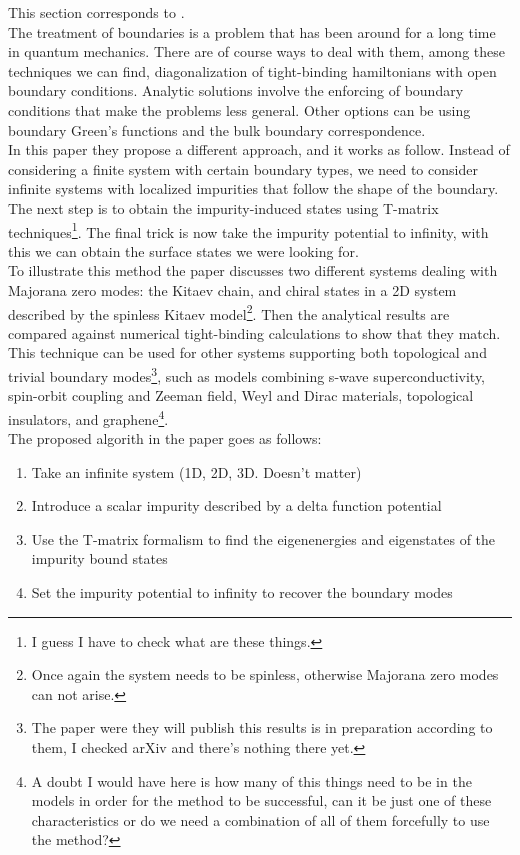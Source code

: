 This section corresponds to \cite{2018Bena}.\\

The treatment of boundaries is a problem that has been around for a long time in quantum mechanics. There are of course ways to deal with them, among these techniques we can find, diagonalization of tight-binding hamiltonians with open boundary conditions. Analytic solutions involve the enforcing of boundary conditions that make the problems less general. Other options can be using boundary Green's functions and the bulk boundary correspondence.\\

In this paper they propose a different approach, and it works as follow. Instead of considering a finite system with certain boundary types, we need to consider infinite systems with localized impurities that follow the shape of the boundary. The next step is to obtain the impurity-induced states using T-matrix techniques\footnote{I guess I have to check what are these things.}. The final trick is now take the impurity potential to infinity, with this we can obtain the surface states we were looking for.\\

To illustrate this method the paper discusses two different systems dealing with Majorana zero modes: the Kitaev chain, and chiral states in a 2D system described by the spinless Kitaev model\footnote{Once again the system needs to be spinless, otherwise Majorana zero modes can not arise.}. Then the analytical results are compared against numerical tight-binding calculations to show that they match. This technique can be used for other systems supporting both topological and trivial boundary modes\footnote{The paper were they will publish this results is in preparation according to them, I checked arXiv and there's nothing there yet.}, such as models combining s-wave superconductivity, spin-orbit coupling and Zeeman field, Weyl and Dirac materials, topological insulators, and graphene\footnote{A doubt I would have here is how many of this things need to be in the models in order for the method to be successful, can it be just one of these characteristics or do we need a combination of all of them forcefully to use the method?}.\\

The proposed algorith in the paper goes as follows:

\begin{enumerate}
    \item Take an infinite system (1D, 2D, 3D. Doesn't matter)
    \item Introduce a scalar impurity described by a delta function potential
    \item Use the T-matrix formalism to find the eigenenergies and eigenstates of the impurity bound states
    \item Set the impurity potential to infinity to recover the boundary modes
\end{enumerate}

